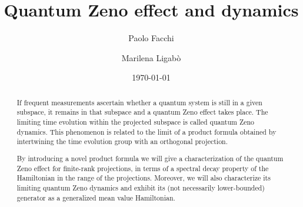 \documentclass[aip,jmp,12pt
]{revtex4}
\theoremstyle{definition}
\begin{document}

\title{Quantum Zeno effect and dynamics} %



\author{Paolo Facchi}


\author{Marilena Ligab\`o}


\date{\today}

\begin{abstract}
If frequent measurements ascertain whether a quantum system is still in a given subspace, it remains in that subspace and a quantum Zeno effect takes place. The limiting time evolution within the projected subspace is called quantum Zeno dynamics. This phenomenon is related to the limit of a product formula obtained by intertwining the time evolution group with an orthogonal projection.

By introducing a novel product formula we will give a characterization of the  quantum Zeno effect for finite-rank projections, in terms of a spectral decay property of the  Hamiltonian in the range of the projections.
Moreover, we will also characterize its limiting quantum Zeno dynamics and exhibit its (not necessarily lower-bounded) generator as a generalized mean value Hamiltonian.
\end{abstract}
\end{document}
